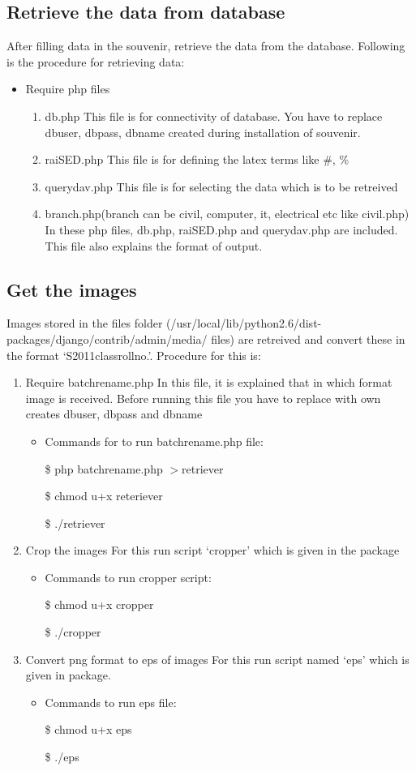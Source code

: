 \documentclass{article}
\begin{document}
\subsection*{Retrieve the data from database}
After filling data in the souvenir, retrieve the data from the database. Following is the procedure for retrieving data:
\begin{itemize}
\item Require php files 
\begin{enumerate}
\item db.php
This file is for connectivity of database. You have to replace dbuser, dbpass, dbname created during installation of souvenir.
\item raiSED.php
This file is for defining the latex terms like \#, \%
\item querydav.php
This file is for selecting the data which is to be retreived
\item branch.php(branch can be civil, computer, it, electrical etc {like civil.php})
In these php files, db.php, raiSED.php and querydav.php are included. This file also explains the format of output.
\end{enumerate}
\end{itemize}

\subsection*{Get the images}
Images stored in the files folder (/usr/local/lib/python2.6/dist-packages/django/contrib/admin/media/
files) are retreived and convert these in the format `S2011classrollno.'. Procedure for this is:
\begin{enumerate}
\item Require batchrename.php
In this file, it is explained that in which format image is received. Before running this file you have to replace with own creates dbuser, dbpass and dbname
\begin{itemize}
\item Commands for to run batchrename.php file:

\$ php batchrename.php $>$retriever 

\$ chmod u+x reteriever

\$ ./retriever
\end{itemize}
\item Crop the images
For this run script `cropper' which is given in the package
\begin{itemize}
\item Commands to run cropper script:

\$ chmod u+x cropper

\$ ./cropper
\end{itemize}
\item Convert png format to eps of images
For this run script named `eps' which is given in package.
\begin{itemize}
\item Commands to run eps file:

\$ chmod u+x eps

\$ ./eps
\end{itemize}
\end{enumerate}
\end{document}
